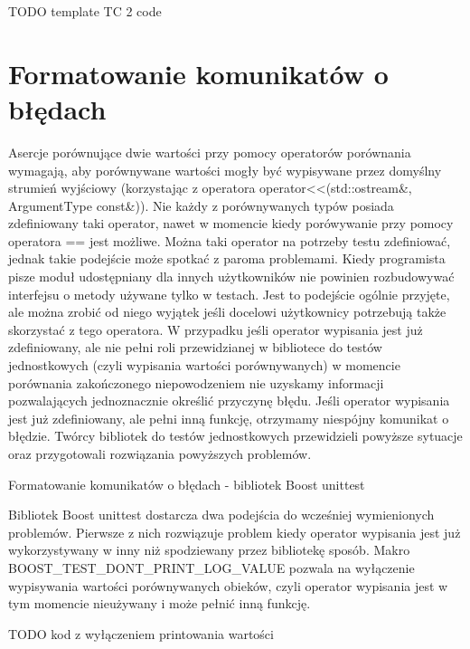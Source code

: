 \documentclass[12pt,a4paper,notitlepage]{report}
\begin{document}
TODO template TC 2 code

\chapter{Formatowanie komunikatów o błędach}

Asercje porównujące dwie wartości przy pomocy operatorów porównania wymagają, aby porównywane wartości mogły być wypisywane przez domyślny strumień wyjściowy (korzystając z operatora operator<<(std::ostream&, ArgumentType const&)). 
Nie każdy z porównywanych typów posiada zdefiniowany taki operator, nawet w momencie kiedy porówywanie przy pomocy operatora == jest możliwe. Można taki operator na potrzeby testu zdefiniować, jednak takie podejście może spotkać z paroma problemami.
Kiedy programista pisze moduł udostępniany dla innych użytkowników nie powinien rozbudowywać interfejsu o metody używane tylko w testach. Jest to podejście ogólnie przyjęte, ale można zrobić od niego wyjątek jeśli docelowi użytkownicy potrzebują także skorzystać z tego operatora.
W przypadku jeśli operator wypisania jest już zdefiniowany, ale nie pełni roli przewidzianej w bibliotece do testów jednostkowych (czyli wypisania wartości porównywanych) w momencie porównania zakończonego niepowodzeniem nie uzyskamy informacji pozwalających jednoznacznie określić przyczynę błędu.
Jeśli operator wypisania jest już zdefiniowany, ale pełni inną funkcję, otrzymamy niespójny komunikat o błędzie.
Twórcy bibliotek do testów jednostkowych przewidzieli powyższe sytuacje oraz przygotowali rozwiązania powyższych problemów.

Formatowanie komunikatów o błędach - bibliotek Boost unittest

Bibliotek Boost unittest dostarcza dwa podejścia do wcześniej wymienionych problemów.
Pierwsze z nich rozwiązuje problem kiedy operator wypisania jest już wykorzystywany w inny niż spodziewany przez bibliotekę sposób. Makro BOOST_TEST_DONT_PRINT_LOG_VALUE pozwala na wyłączenie wypisywania wartości porównywanych obieków, czyli operator wypisania jest w tym momencie nieużywany i może pełnić inną funkcję.

TODO kod z wyłączeniem printowania wartości
\end{document}
